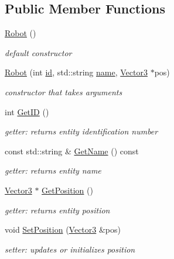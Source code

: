 \subsection*{Public Member Functions}
\begin{DoxyCompactItemize}
\item 
\mbox{\label{classRobot_a4fc7c70ae20623f05e06f2ecb388b6c4}} 
\hyperlink{classRobot_a4fc7c70ae20623f05e06f2ecb388b6c4}{Robot} ()
\begin{DoxyCompactList}\small\item\em default constructor \end{DoxyCompactList}\item 
\mbox{\label{classRobot_a1947e62ff7214534b8789a891e918334}} 
\hyperlink{classRobot_a1947e62ff7214534b8789a891e918334}{Robot} (int \hyperlink{classRobot_ad7fd8fd1721ae41eb67246b9b360e7a6}{id}, std\+::string \hyperlink{classRobot_ae11f12fef20c4252161c6b774a436f1d}{name}, \hyperlink{classVector3}{Vector3} $\ast$pos)
\begin{DoxyCompactList}\small\item\em constructor that takes arguments \end{DoxyCompactList}\item 
\mbox{\label{classRobot_a1342184ee0f68a87a00876cff4f57c40}} 
int \hyperlink{classRobot_a1342184ee0f68a87a00876cff4f57c40}{Get\+ID} ()
\begin{DoxyCompactList}\small\item\em getter\+: returns entity identification number \end{DoxyCompactList}\item 
\mbox{\label{classRobot_a86cf5fdd49ff62fbf8643d7f49d2c058}} 
const std\+::string \& \hyperlink{classRobot_a86cf5fdd49ff62fbf8643d7f49d2c058}{Get\+Name} () const
\begin{DoxyCompactList}\small\item\em getter\+: returns entity name \end{DoxyCompactList}\item 
\mbox{\label{classRobot_a7111d4ee778aa782489e711ceb1cd2bc}} 
\hyperlink{classVector3}{Vector3} $\ast$ \hyperlink{classRobot_a7111d4ee778aa782489e711ceb1cd2bc}{Get\+Position} ()
\begin{DoxyCompactList}\small\item\em getter\+: returns entity position \end{DoxyCompactList}\item 
\mbox{\label{classRobot_a504c8f5b4ccd83f13500593ca05ad092}} 
void \hyperlink{classRobot_a504c8f5b4ccd83f13500593ca05ad092}{Set\+Position} (\hyperlink{classVector3}{Vector3} \&pos)
\begin{DoxyCompactList}\small\item\em setter\+: updates or initializes position \end{DoxyCompactList}\end{DoxyCompactItemize}
